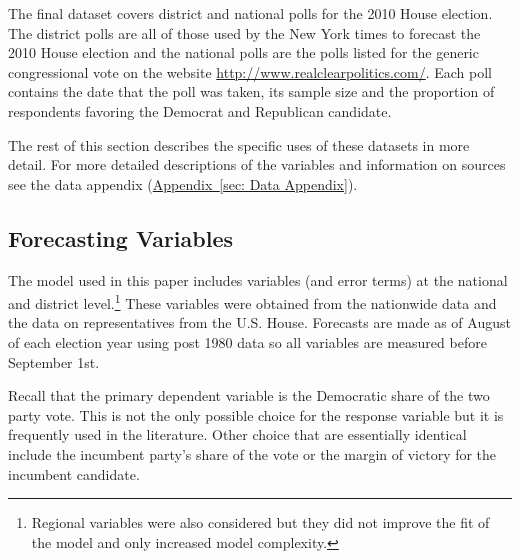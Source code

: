 \documentclass[12pt,final,fleqn]{article}
\newcommand{\aref}[1]{\hyperref[#1]{Appendix~\ref{#1}}}
\theoremstyle{plain}
\begin{document}
The final dataset covers district and national polls for the 2010 House election. The district polls are all of those used by the New York times to forecast the 2010 House election and the national polls are the polls listed for the generic congressional vote on the website \url{http://www.realclearpolitics.com/}. Each poll contains the date that the poll was taken, its sample size and the proportion of respondents favoring the Democrat and Republican candidate. 

The rest of this section describes the specific uses of these datasets in more detail. For more detailed descriptions of the variables and information on sources see the data appendix (\aref{sec: Data Appendix}).

\subsection{Forecasting Variables}
The model used in this paper includes variables (and error terms) at the national and district level.\footnote{Regional variables were also considered but they did not improve the fit of the model and only increased model complexity.} These variables were obtained from the nationwide data and the data on representatives from the U.S. House. Forecasts are made as of August of each election year using post 1980 data so all variables are measured before September 1st.

Recall that the primary dependent variable is the Democratic share of the two party vote. This is not the only possible choice for the response variable but it is frequently used in the literature. Other choice that are essentially identical include the incumbent party's share of the vote or the margin of victory for the incumbent candidate.
\end{document}
